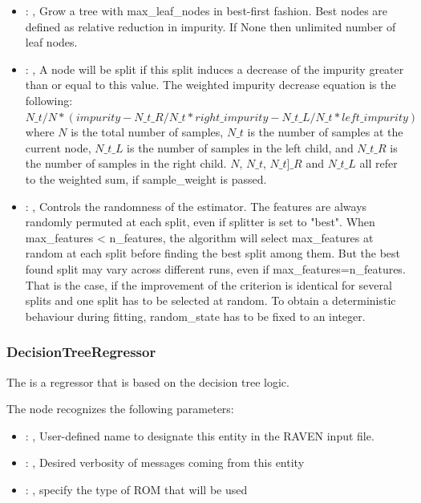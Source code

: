 \begin{itemize}
    \item {}: ,
      Grow a tree with max\_leaf\_nodes in best-first fashion. Best nodes are defined as relative
      reduction                                                  in impurity. If None then unlimited
      number of leaf nodes.

    \item {}: ,
      A node will be split if this split induces a decrease of the impurity greater than or equal to
      this value.                                                  The weighted impurity decrease
      equation is the following:                                                  $N\_t / N *
      (impurity - N\_t\_R / N\_t * right\_impurity - N\_t\_L / N\_t * left\_impurity)$
      where $N$ is the total number of samples, $N\_t$ is the number of samples at the current node,
      $N\_t\_L$ is the number                                                  of samples in the
      left child, and $N\_t\_R$ is the number of samples in the right child.
      $N$, $N\_t$, $N\_t]\_R$ and $N\_t\_L$ all refer to the weighted sum, if sample\_weight is
      passed.

    \item {}: ,
      Controls the randomness of the estimator. The features are
      always randomly permuted at each split, even if splitter is set to
      "best". When max\_features < n\_features, the algorithm will select
      max\_features at random at each split before finding the best split
      among them. But the best found split may vary across different runs,
      even if max\_features=n\_features. That is the case, if the improvement
      of the criterion is identical for several splits and one split has to
      be selected at random. To obtain a deterministic behaviour during
      fitting, random\_state has to be fixed to an integer.
  \end{itemize}


\subsubsection{DecisionTreeRegressor}
  The  is a regressor that is based on the
  decision tree logic.                          

  The  node recognizes the following parameters:
    \begin{itemize}
      \item {}: ,
        User-defined name to designate this entity in the RAVEN input file.
      \item {}: ,
        Desired verbosity of messages coming from this entity
      \item {}: ,
        specify the type of ROM that will be used
  \end{itemize}

